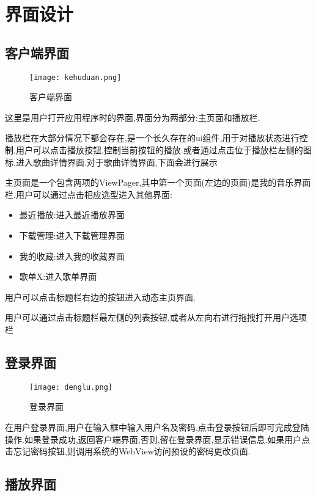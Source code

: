 \chapter{界面设计}
\section{客户端界面}
\vspace{3ex}
\begin{figure}[H]
	\centering
	\texttt{[image: kehuduan.png]}
	\caption{客户端界面} 
	\label{fig:figure8}
\end{figure}


这里是用户打开应用程序时的界面,界面分为两部分:主页面和播放栏.


播放栏在大部分情况下都会存在,是一个长久存在的ui组件,用于对播放状态进行控制,用户可以点击播放按钮,控制当前按钮的播放.或者通过点击位于播放栏左侧的图标,进入歌曲详情界面.对于歌曲详情界面,下面会进行展示


主页面是一个包含两项的ViewPager,其中第一个页面(左边的页面)是我的音乐界面栏.用户可以通过点击相应选型进入其他界面:
\begin{itemize}
	\item 最近播放:进入最近播放界面
	\item 下载管理:进入下载管理界面
	\item 我的收藏:进入我的收藏界面
	\item 歌单X:进入歌单界面
\end{itemize}

用户可以点击标题栏右边的按钮进入动态主页界面.

用户可以通过点击标题栏最左侧的列表按钮,或者从左向右进行拖拽打开用户选项栏


\section{登录界面}
\begin{figure}[H]
	\centering
	\texttt{[image: denglu.png]}
	\caption{登录界面} 
	\label{fig:figure1ss8}
\end{figure}

在用户登录界面,用户在输入框中输入用户名及密码,点击登录按钮后即可完成登陆操作.如果登录成功,返回客户端界面,否则,留在登录界面,显示错误信息.如果用户点击忘记密码按钮,则调用系统的WebView访问预设的密码更改页面.

\section{播放界面}


